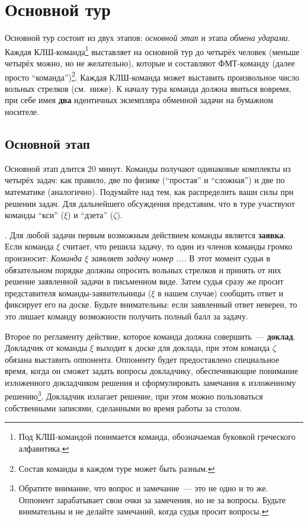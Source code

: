 \documentclass[12pt]{article}
\begin{document}
\section*{Основной тур}
Основной тур состоит из двух этапов: \textsl{основной этап} и этапа \textsl{обмена ударами}. Каждая КЛШ-команда\footnote{Под КЛШ-командой понимается команда, обозначаемая буковкой греческого алфавитика.} выставляет на основной тур до четырёх человек (меньше четырёх можно, но не желательно), которые и составляют ФМТ-команду (далее просто ``команда'')\footnote{Состав команды в каждом туре может быть разным.}. Каждая КЛШ-команда может выставить произвольное число вольных стрелков (см.~ниже). К началу тура команда должна явиться вовремя, при себе имея {\bf два} идентичных экземпляра обменной задачи на бумажном носителе.

\subsection*{Основной этап}
Основной этап длится 20 минут. Команды получают одинаковые комплекты из четырёх задач: как правило, две по физике (``простая'' и ``сложная'') и две по математике (аналогично). Подумайте над тем, как распределить ваши силы при решении задач. Для дальнейшего обсуждения представим, что в туре участвуют команды ``кси'' ($\xi$) и ``дзета'' ($\zeta$).

. Для любой задачи первым возможным действием команды является {\bf заявка}. Если команда $\xi$ считает, что решила задачу, то один из членов команды громко произносит: \textsl{Команда $\xi$ заявляет задачу номер ...}. В этот момент судьи в обязательном порядке должны опросить вольных стрелков и принять от них решение заявленной задачи в письменном виде. Затем судья сразу же просит представителя команды-заявительницы ($\xi$ в нашем случае) сообщить ответ и фиксирует его на доске. Будьте внимательны: если заявленный ответ неверен, то это лишает команду возможности получить полный балл за задачу.

Второе по регламенту действие, которое команда должна совершить~--- {\bf доклад}. Докладчик от команды $\xi$ выходит к доске для доклада, при этом команда $\zeta$ обязана выставить оппонента. Оппоненту будет предоставлено специальное время, когда он сможет задать вопросы докладчику, обеспечивающие понимание изложенного докладчиком решения и сформулировать замечания к изложенному решению\footnote{Обратите внимание, что вопрос и замечание~--- это не одно и то же. Оппонент зарабатывает свои очки за замечения, но не за вопросы. Будьте внимательны и не делайте замечаний, когда судья просит вопросы.}. Докладчик излагает решение, при этом можно пользоваться собственными записями, сделанными во время работы за столом.
\end{document}
